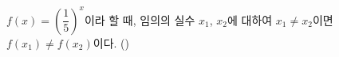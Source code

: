 $f(x)=\left(\dfrac{1}{5}\right)^{x}$이라 할 때, 임의의 실수 $x_1$, $x_2$에 대하여 $x_1\ne x_2$이면 $f(x_1)\ne f(x_2)$이다. \hfill (\hspace*{2.4em})
